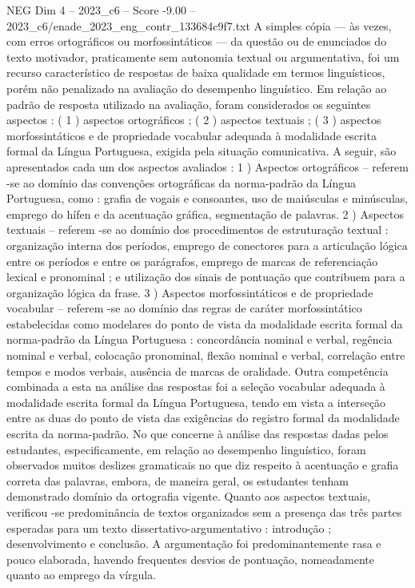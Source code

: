 \begin{textsample}{NEG Dim 4 – 2023\_c6 – Score -9.00 – 2023\_c6/enade\_2023\_eng\_contr\_133684c9f7.txt}
A simples cópia — às vezes, com erros ortográficos ou morfossintáticos — da questão ou de enunciados do texto motivador, praticamente sem autonomia textual ou argumentativa, foi um recurso característico de respostas de baixa qualidade em termos linguísticos, porém não penalizado na avaliação do desempenho linguístico.
Em relação ao padrão de resposta utilizado na avaliação, foram considerados os seguintes aspectos : ( 1 ) aspectos ortográficos ; ( 2 ) aspectos textuais ; ( 3 ) aspectos morfossintáticos e de propriedade vocabular adequada à modalidade escrita formal da Língua Portuguesa, exigida pela situação comunicativa.
A seguir, são apresentados cada um dos aspectos avaliados : 1 ) Aspectos ortográficos – referem -se ao domínio das convenções ortográficas da norma-padrão da Língua Portuguesa, como : grafia de vogais e consoantes, uso de maiúsculas e minúsculas, emprego do hífen e da acentuação gráfica, segmentação de palavras. 2 ) Aspectos textuais – referem -se ao domínio dos procedimentos de estruturação textual : organização interna dos períodos, emprego de conectores para a articulação lógica entre os períodos e entre os parágrafos, emprego de marcas de referenciação lexical e pronominal ; e utilização dos sinais de pontuação que contribuem para a organização lógica da frase. 3 ) Aspectos morfossintáticos e de propriedade vocabular – referem -se ao domínio das regras de caráter morfossintático estabelecidas como modelares do ponto de vista da modalidade escrita formal da norma-padrão da Língua Portuguesa : concordância nominal e verbal, regência nominal e verbal, colocação pronominal, flexão nominal e verbal, correlação entre tempos e modos verbais, ausência de marcas de oralidade.
Outra competência combinada a esta na análise das respostas foi a seleção vocabular adequada à modalidade escrita formal da Língua Portuguesa, tendo em vista a interseção entre as duas do ponto de vista das exigências do registro formal da modalidade escrita da norma-padrão.
No que concerne à análise das respostas dadas pelos estudantes, especificamente, em relação ao desempenho linguístico, foram observados muitos deslizes gramaticais no que diz respeito à acentuação e grafia correta das palavras, embora, de maneira geral, os estudantes tenham demonstrado domínio da ortografia vigente.
Quanto aos aspectos textuais, verificou -se predominância de textos organizados sem a presença das três partes esperadas para um texto dissertativo-argumentativo : introdução ; desenvolvimento e conclusão.
A argumentação foi predominantemente rasa e pouco elaborada, havendo frequentes desvios de pontuação, nomeadamente quanto ao emprego da vírgula.

\end{textsample}
